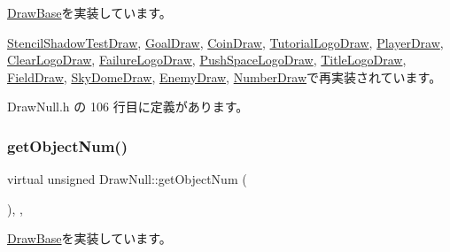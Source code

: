 \mbox{\hyperlink{class_draw_base_add488139aed539e7ccd19492702b4bee}{Draw\+Base}}を実装しています。



\mbox{\hyperlink{class_stencil_shadow_test_draw_a285b3045ff5cc34b6b2b991cca434bb3}{Stencil\+Shadow\+Test\+Draw}}, \mbox{\hyperlink{class_goal_draw_ac80c8da78cda7b15a4ce46f7d7057622}{Goal\+Draw}}, \mbox{\hyperlink{class_coin_draw_a8ebedf2582d53b40016ebd3f0e82c38e}{Coin\+Draw}}, \mbox{\hyperlink{class_tutorial_logo_draw_a0e56784e25f1f83e6ff167280b801aad}{Tutorial\+Logo\+Draw}}, \mbox{\hyperlink{class_player_draw_ac618153d70492f73299c58a50d565431}{Player\+Draw}}, \mbox{\hyperlink{class_clear_logo_draw_a257f34e6f8325580f7df835f20d2ebb4}{Clear\+Logo\+Draw}}, \mbox{\hyperlink{class_failure_logo_draw_a45bb5d0965ca73b06ae0836f27f9b0e3}{Failure\+Logo\+Draw}}, \mbox{\hyperlink{class_push_space_logo_draw_abaa66b6e3c46aa03bae21bad271eebc0}{Push\+Space\+Logo\+Draw}}, \mbox{\hyperlink{class_title_logo_draw_a20a0e0c3569e49eb421ab4b5a65777cd}{Title\+Logo\+Draw}}, \mbox{\hyperlink{class_field_draw_a0894ddd73716f0db8ceed4b7d89f23fd}{Field\+Draw}}, \mbox{\hyperlink{class_sky_dome_draw_a6b281bafa71c058ee83c373ad978e3bb}{Sky\+Dome\+Draw}}, \mbox{\hyperlink{class_enemy_draw_a1d8a943e4b625795bbd5ae614cc38ed1}{Enemy\+Draw}}, \mbox{\hyperlink{class_number_draw_abcd88040b2b6d5dd7d21e8cfd50b1682}{Number\+Draw}}で再実装されています。



 Draw\+Null.\+h の 106 行目に定義があります。

\mbox{\label{class_draw_null_ae71c0b03f98748a4eb1d2e2635bcc146}} 
\subsubsection{\texorpdfstring{get\+Object\+Num()}{getObjectNum()}}
{\footnotesize\ttfamily virtual unsigned Draw\+Null\+::get\+Object\+Num (\begin{DoxyParamCaption}{ }\end{DoxyParamCaption})\hspace{0.3cm}{\ttfamily [inline]}, {\ttfamily [override]}, {\ttfamily [virtual]}}



\mbox{\hyperlink{class_draw_base_a57c010b4386dc09afa124fba81a6e0fc}{Draw\+Base}}を実装しています。




